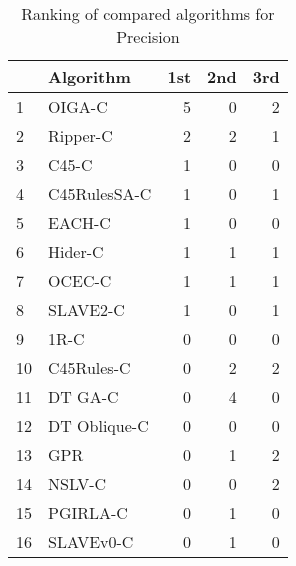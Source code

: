 \begin{table}
\footnotesize
\caption{Ranking of compared algorithms for Precision}
\label{tab:places Precision}
\begin{tabular}{llrrr}
\hline
 & Algorithm & 1st & 2nd & 3rd \\
\hline
1 & OIGA-C & 5 & 0 & 2 \\
2 & Ripper-C & 2 & 2 & 1 \\
3 & C45-C & 1 & 0 & 0 \\
4 & C45RulesSA-C & 1 & 0 & 1 \\
5 & EACH-C & 1 & 0 & 0 \\
6 & Hider-C & 1 & 1 & 1 \\
7 & OCEC-C & 1 & 1 & 1 \\
8 & SLAVE2-C & 1 & 0 & 1 \\
9 & 1R-C & 0 & 0 & 0 \\
10 & C45Rules-C & 0 & 2 & 2 \\
11 & DT GA-C & 0 & 4 & 0 \\
12 & DT Oblique-C & 0 & 0 & 0 \\
13 & GPR & 0 & 1 & 2 \\
14 & NSLV-C & 0 & 0 & 2 \\
15 & PGIRLA-C & 0 & 1 & 0 \\
16 & SLAVEv0-C & 0 & 1 & 0 \\
\hline
\end{tabular}
\end{table}
